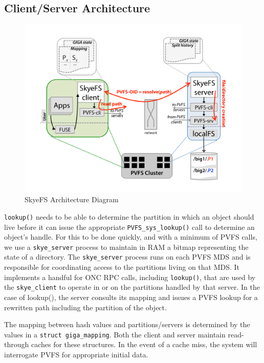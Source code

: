 \documentclass[letterpaper]{article}
\newcommand{\code}[1]{\texttt{#1}}
\begin{document}
\subsection{Client/Server Architecture}
\begin{figure}
\begin{center}
\includegraphics[scale=0.4]{figure-architecture}
\end{center}
\caption{SkyeFS Architecture Diagram}
\end{figure}
\code{lookup()} needs to be able to determine the partition in which an object
should live before it can issue the appropriate \code{PVFS\_\-sys\_\-lookup()}
call to determine an object's handle.  For this to be done quickly, and with a
minimum of PVFS calls, we use a \code{skye\_\-server} process to maintain in
RAM a bitmap representing the state of a directory.  The \code{skye\_\-server}
process runs on each PVFS MDS and is responsible for coordinating access to
the partitions living on that MDS.  It implements a handful for ONC RPC calls,
including \code{lookup()}, that are used by the \code{skye\_\-client} to
operate in or on the partitions handled by that server.  In the case of
lookup(), the server consults its mapping and issues a PVFS lookup for a
rewritten path including the partition of the object.

The mapping between hash values and partitions/servers is determined by the
values in a \code{struct giga\_\-mapping}.  Both the client and server
maintain read-through caches for these structures.  In the event of a cache
miss, the system will interrogate PVFS for appropriate initial data.
\end{document}
